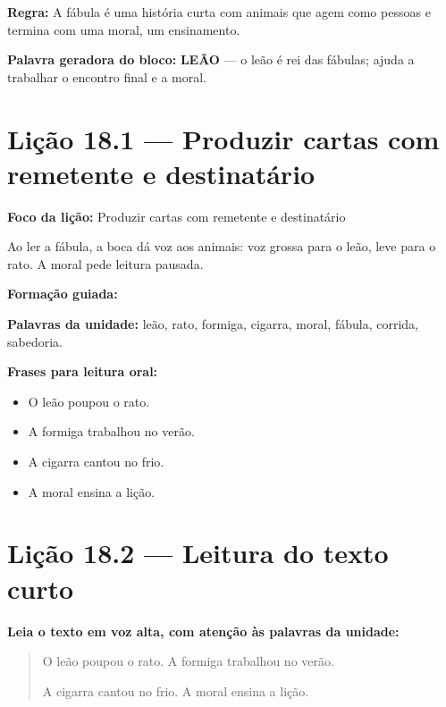 \textbf{Regra:} A fábula é uma história curta com animais que agem como pessoas e termina com uma moral, um ensinamento.

\textbf{Palavra geradora do bloco:} \textbf{LEÃO} --- o leão é rei das fábulas; ajuda a trabalhar o encontro final e a moral.

\section{Lição 18.1 --- Produzir cartas com remetente e destinatário}

\textbf{Foco da lição:} Produzir cartas com remetente e destinatário


\begin{boquinha}
Ao ler a fábula, a boca dá voz aos animais: voz grossa para o leão, leve para o rato. A moral pede leitura pausada.
\end{boquinha}

\noindent\textbf{Formação guiada:}

\begin{center}
\end{center}

\noindent\textbf{Palavras da unidade:} leão, rato, formiga, cigarra, moral, fábula, corrida, sabedoria.

\noindent\textbf{Frases para leitura oral:}
\begin{itemize}[leftmargin=1.6em]
  \item O leão poupou o rato.
  \item A formiga trabalhou no verão.
  \item A cigarra cantou no frio.
  \item A moral ensina a lição.
\end{itemize}

\section{Lição 18.2 --- Leitura do texto curto}

\noindent\textbf{Leia o texto em voz alta, com atenção às palavras da unidade:}


\begin{quote}
O leão poupou o rato. A formiga trabalhou no verão.

A cigarra cantou no frio. A moral ensina a lição.
\end{quote}

